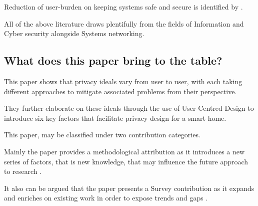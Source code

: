 Reduction of user-burden on keeping systems safe and secure is identified by \textcite{23}.

All of the above literature draws plentifully from the fields of Information and Cyber security alongside Systems networking.

\subsection{What does this paper bring to the table?}

This paper shows that privacy ideals vary from user to user, with each taking different approaches to mitigate associated problems from their perspective. 

They further elaborate on these ideals through the use of User-Centred Design to introduce six key factors that facilitate privacy design for a smart home.

This paper, may be classified under two contribution categories.

Mainly the paper provides a methodological attribution as it introduces a new series of factors, that is new knowledge, that may influence the future approach to research \parencite{acmMethods}.

It also can be argued that the paper presents a Survey contribution as it expands and enriches on existing work in order to expose trends and gaps \parencite{acmMethods}.